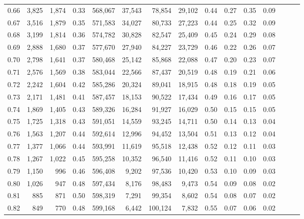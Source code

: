 \begin{tabular}{rrrrrrrrrrrrrrr}
0.66 &   3,825 &  1,874 &  0.33 &  568,067 &   37,543 &   78,854 &   29,102 &  0.44 &  0.27 &  0.35 &      0.09 \\
0.67 &   3,516 &  1,879 &  0.35 &  571,583 &   34,027 &   80,733 &   27,223 &  0.44 &  0.25 &  0.32 &      0.09 \\
0.68 &   3,199 &  1,814 &  0.36 &  574,782 &   30,828 &   82,547 &   25,409 &  0.45 &  0.24 &  0.29 &      0.08 \\
0.69 &   2,888 &  1,680 &  0.37 &  577,670 &   27,940 &   84,227 &   23,729 &  0.46 &  0.22 &  0.26 &      0.07 \\
0.70 &   2,798 &  1,641 &  0.37 &  580,468 &   25,142 &   85,868 &   22,088 &  0.47 &  0.20 &  0.23 &      0.07 \\
0.71 &   2,576 &  1,569 &  0.38 &  583,044 &   22,566 &   87,437 &   20,519 &  0.48 &  0.19 &  0.21 &      0.06 \\
0.72 &   2,242 &  1,604 &  0.42 &  585,286 &   20,324 &   89,041 &   18,915 &  0.48 &  0.18 &  0.19 &      0.05 \\
0.73 &   2,171 &  1,481 &  0.41 &  587,457 &   18,153 &   90,522 &   17,434 &  0.49 &  0.16 &  0.17 &      0.05 \\
0.74 &   1,869 &  1,405 &  0.43 &  589,326 &   16,284 &   91,927 &   16,029 &  0.50 &  0.15 &  0.15 &      0.05 \\
0.75 &   1,725 &  1,318 &  0.43 &  591,051 &   14,559 &   93,245 &   14,711 &  0.50 &  0.14 &  0.13 &      0.04 \\
0.76 &   1,563 &  1,207 &  0.44 &  592,614 &   12,996 &   94,452 &   13,504 &  0.51 &  0.13 &  0.12 &      0.04 \\
0.77 &   1,377 &  1,066 &  0.44 &  593,991 &   11,619 &   95,518 &   12,438 &  0.52 &  0.12 &  0.11 &      0.03 \\
0.78 &   1,267 &  1,022 &  0.45 &  595,258 &   10,352 &   96,540 &   11,416 &  0.52 &  0.11 &  0.10 &      0.03 \\
0.79 &   1,150 &    996 &  0.46 &  596,408 &    9,202 &   97,536 &   10,420 &  0.53 &  0.10 &  0.09 &      0.03 \\
0.80 &   1,026 &    947 &  0.48 &  597,434 &    8,176 &   98,483 &    9,473 &  0.54 &  0.09 &  0.08 &      0.02 \\
0.81 &     885 &    871 &  0.50 &  598,319 &    7,291 &   99,354 &    8,602 &  0.54 &  0.08 &  0.07 &      0.02 \\
0.82 &     849 &    770 &  0.48 &  599,168 &    6,442 &  100,124 &    7,832 &  0.55 &  0.07 &  0.06 &      0.02 \\

\end{tabular}

